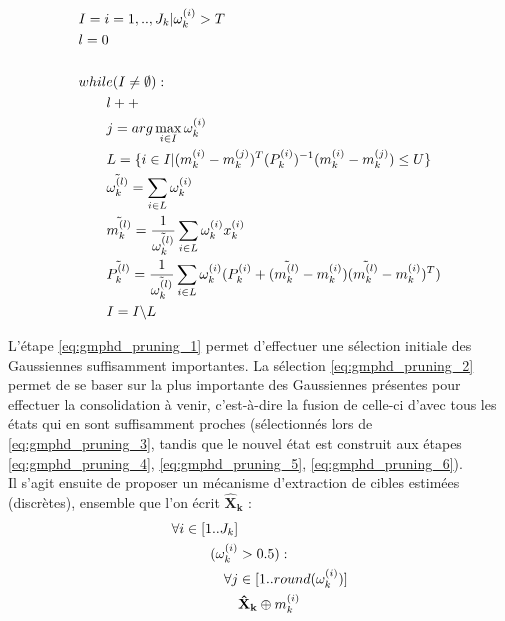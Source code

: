 \begin{align}
	&I = {i = 1,..,J_k | \omega_k^{(i)} > T} 								\label{eq:gmphd_pruning_1}\\
	&l = 0																									\\ \notag \\
	&while(I \neq \emptyset ): 															\notag\\
	&\hspace{20pt} l++ 																			\\
	&\hspace{20pt} j = arg \max_{i \in I} \omega_k^{(i)} 		\label{eq:gmphd_pruning_2}\\
	&\hspace{20pt} L = \lbrace i \in I | (m_k^{(i)} - m_k^{(j)})^T (P_k^{(i)})^{-1} (m_k^{(i)} - m_k^{(j)}) \leq U  \rbrace 	\label{eq:gmphd_pruning_3}\\
	&\hspace{20pt} \tilde{\omega_k^{(l)}} = \sum\limits_{i \in L} \omega_k^{(i)}																							\label{eq:gmphd_pruning_4}\\
	&\hspace{20pt} \tilde{m_k^{(l)}} = \frac{1}{\tilde{\omega_k^{(l)}}} \sum\limits_{i\in L} \omega_k^{(i)} x_k^{(i)} 				\label{eq:gmphd_pruning_5}\\
	&\hspace{20pt} \tilde{P_k^{(l)}} = \frac{1}{\tilde{\omega_k^{(l)}}} \sum\limits_{i\in L} \omega_k^{(i)} (P_k^{(i)} + (\tilde{m_k^{(l)}} - m_k^{(i)})(\tilde{m_k^{(l)}} - m_k^{(i)})^T) \label{eq:gmphd_pruning_6}\\
	&\hspace{20pt} I = I \backslash L
\end{align}

L'étape \ref{eq:gmphd_pruning_1} permet d'effectuer une sélection initiale des Gaussiennes suffisamment importantes. La sélection \ref{eq:gmphd_pruning_2} permet de se baser sur la plus importante des Gaussiennes présentes pour effectuer la consolidation à venir, c'est-à-dire la fusion de celle-ci d'avec tous les états qui en sont suffisamment proches (sélectionnés lors de \ref{eq:gmphd_pruning_3}, tandis que le nouvel état est construit aux étapes \ref{eq:gmphd_pruning_4}, \ref{eq:gmphd_pruning_5}, \ref{eq:gmphd_pruning_6}).\\

Il s'agit ensuite de proposer un mécanisme d'extraction de cibles estimées (discrètes), ensemble que l'on écrit $\mathbf{\hat{X}_k}$ :
\begin{align}
	\forall i \in [1 .. J_k]& 	\notag \\
		(\omega_k^{(i)} &> 0.5): 	\notag \\
			\forall j &\in [1 .. round(\omega_k^{(i)})]	\notag \\	
				&\mathbf{\hat{X}_k} \oplus m_k^{(i)}
\end{align}

